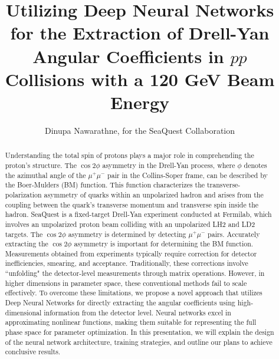 \documentclass{article}
\title{Utilizing Deep Neural Networks for the Extraction of Drell-Yan Angular Coefficients in $pp$ Collisions with a 120 GeV Beam Energy}
\author{Dinupa Nawarathne, for the SeaQuest Collaboration}
\begin{document}
\maketitle

\begin{abstract}
Understanding the total spin of protons plays a major role in comprehending the proton's structure. The $\cos2\phi$ asymmetry
in the Drell-Yan process, where $\phi$ denotes the azimuthal angle of the $\mu^{+}\mu^{-}$ pair in the Collins-Soper
frame, can be described by the Boer-Mulders (BM) function. This function characterizes the transverse-polarization asymmetry
of quarks within an unpolarized hadron and arises from the coupling between the quark's transverse momentum and transverse
spin inside the hadron. SeaQuest is a fixed-target Drell-Yan experiment conducted at Fermilab, which involves an unpolarized
proton beam colliding with an unpolarized LH2 and LD2 targets. The $\cos2\phi$ asymmetry is determined by detecting $\mu^{+}\mu^{-}$
pairs. Accurately extracting the $\cos2\phi$ asymmetry is important for determining the BM function. Measurements obtained
from experiments typically require correction for detector inefficiencies, smearing, and acceptance. Traditionally, these
corrections involve ``unfolding" the detector-level measurements through matrix operations. However, in higher dimensions
in parameter space, these conventional methods fail to scale effectively. To overcome these limitations, we propose a
novel approach that utilizes Deep Neural Networks for directly extracting the angular coefficients using high-dimensional
information from the detector level. Neural networks excel in approximating nonlinear functions, making them suitable for
representing the full phase space for parameter optimization. In this presentation, we will explain the design of the neural
network architecture, training strategies, and outline our plans to achieve conclusive results.
\end{abstract}
\end{document}

